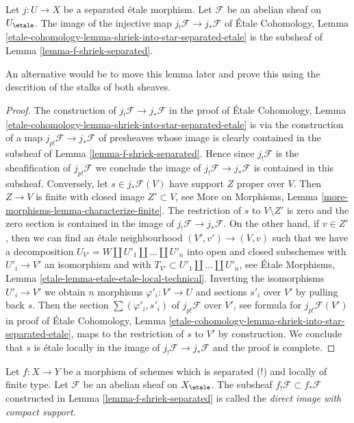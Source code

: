 \begin{lemma}
\label{lemma-separated-etale-shriek}
Let $j : U \to X$ be a separated \'etale morphism. Let $\mathcal{F}$
be an abelian sheaf on $U_\etale$. The image of the injective map
$j_!\mathcal{F} \to j_*\mathcal{F}$ of
\'Etale Cohomology, Lemma
\ref{etale-cohomology-lemma-shriek-into-star-separated-etale}
is the subsheaf of Lemma \ref{lemma-f-shriek-separated}.
\end{lemma}

\noindent
An alternative would be to move this lemma later and prove this
using the descrition of the stalks of both sheaves.

\begin{proof}
The construction of $j_!\mathcal{F} \to j_*\mathcal{F}$ in the proof of
\'Etale Cohomology, Lemma
\ref{etale-cohomology-lemma-shriek-into-star-separated-etale}
is via the construction of a map
$j_{p!}\mathcal{F} \to j_*\mathcal{F}$ of presheaves
whose image is clearly contained in the subsheaf of
Lemma \ref{lemma-f-shriek-separated}.
Hence since $j_!\mathcal{F}$ is the sheafification of
$j_{p!}\mathcal{F}$ we conclude the image of
$j_!\mathcal{F} \to j_*\mathcal{F}$ is contained in
this subsheaf. Conversely, let $s \in j_*\mathcal{F}(V)$
have support $Z$ proper over $V$. Then $Z \to V$ is
finite with closed image $Z' \subset V$, see
More on Morphisms, Lemma \ref{more-morphisms-lemma-characterize-finite}.
The restriction of $s$ to $V \setminus Z'$ is zero and the zero section is
contained in the image of $j_!\mathcal{F} \to j_*\mathcal{F}$.
On the other hand, if $v \in Z'$, then we can find
an \'etale neighbourhood
$(V', v') \to (V, v)$ such that we have a decomposition
$U_{V'} = W \amalg U'_1 \amalg \ldots \amalg U'_n$
into open and closed subschemes with $U'_i \to V'$ an isomorphism
and with $T_{V'} \subset U'_1 \amalg \ldots \amalg U'_n$, see
\'Etale Morphisms, Lemma \ref{etale-lemma-etale-etale-local-technical}.
Inverting the isomorphisms $U'_i \to V'$
we obtain $n$ morphisms $\varphi'_i : V' \to U$
and sections $s'_i$ over $V'$ by pulling back $s$.
Then the section $\sum (\varphi'_i, s'_i)$ of
$j_{p!}\mathcal{F}$ over $V'$, see formula for $j_{p!}\mathcal{F}(V')$
in proof of \'Etale Cohomology, Lemma
\ref{etale-cohomology-lemma-shriek-into-star-separated-etale},
maps to the restriction of $s$ to $V'$ by construction.
We conclude that $s$ is \'etale locally in the image
of $j_!\mathcal{F} \to j_*\mathcal{F}$ and the proof is complete.
\end{proof}

\begin{definition}
\label{definition-f-shriek-separated}
Let $f : X \to Y$ be a morphism of schemes which is separated (!) and
locally of finite type. Let $\mathcal{F}$ be an abelian sheaf on
$X_\etale$. The subsheaf $f_!\mathcal{F} \subset f_*\mathcal{F}$
constructed in Lemma \ref{lemma-f-shriek-separated} is called the
{\it direct image with compact support}.
\end{definition}

